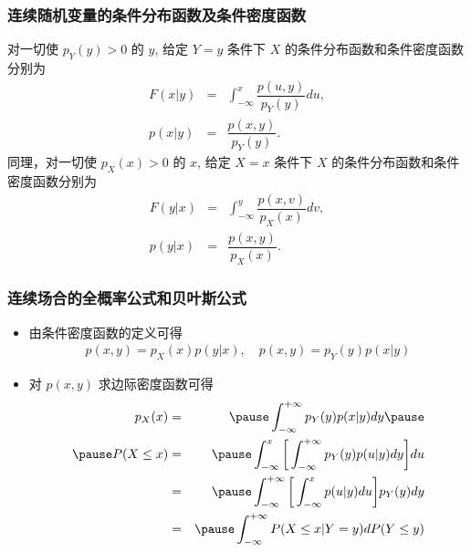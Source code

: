 \documentclass[Prob-All.tex]{subfiles}
\begin{document}
\begin{frame}
	\frametitle{连续随机变量的条件分布函数及条件密度函数}
	\begin{defi}
		对一切使 $p_Y (y)>0$ 的 $y$, 给定 $Y=y$ 条件下 $X$ 的条件分布函数和条件密度函数分别为
		\begin{eqnarray*}
			F(x|y)&=&\int_{-\infty}^x\dfrac{p(u,y)}{p_Y(y)}du,\\
			p(x|y)&=&\dfrac{p(x,y)}{p_Y(y)}.
		\end{eqnarray*}
		同理，对一切使 $p_X (x)>0$ 的 $x$, 给定 $X=x$ 条件下 $X$ 的条件分布函数和条件密度函数分别为
		\begin{eqnarray*}
			F(y|x)&=&\int_{-\infty}^y\dfrac{p(x,v)}{p_X(x)}dv,\\
			p(y|x)&=&\dfrac{p(x,y)}{p_X(x)}.
		\end{eqnarray*}
	\end{defi}
\end{frame}
\begin{frame}
	\frametitle{连续场合的全概率公式和贝叶斯公式}
	\begin{itemize}[<+-|alert@+>]
		\item 由条件密度函数的定义可得
		\begin{eqnarray*}
			p(x,y)=p_X(x)p(y|x), \quad p(x,y)=p_Y(y)p(x|y)
		\end{eqnarray*}
		\item 对 $p (x,y)$ 求边际密度函数可得
		\begin{eqnarray*}
			p_X(x)&=&\pause \int_{-\infty}^{+\infty}p_Y(y)p(x|y)dy\pause \\
			\pause P(X\le x)&=&\pause \int_{-\infty}^x\bigg[\int_{-\infty}^{+\infty}p_Y(y)p(u|y)dy\bigg]du\\
			&=&\pause \int_{-\infty}^{+\infty}\bigg[\int_{-\infty}^xp(u|y)du\bigg]p_Y(y)dy\\
			&=&\pause \int_{-\infty}^{+\infty}P(X\le x|Y=y)dP(Y\le y)
		\end{eqnarray*}

	\end{itemize}
\end{frame}
\end{document}
